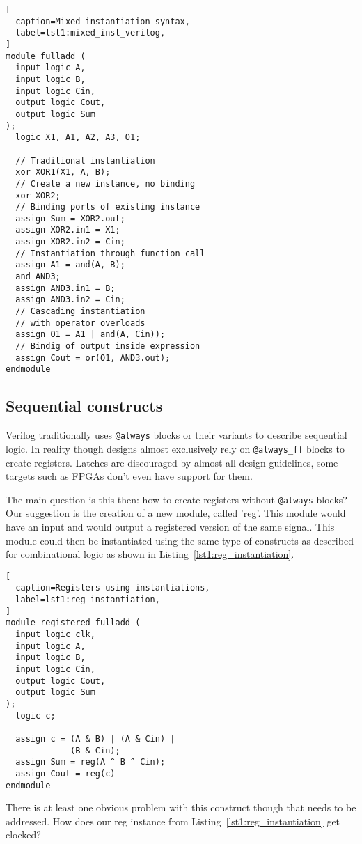 \documentclass[conference,compsoc]{IEEEtran}
\begin{document}
\begin{lstlisting}[
  caption=Mixed instantiation syntax,
  label=lst1:mixed_inst_verilog,
]
module fulladd (
  input logic A,
  input logic B,
  input logic Cin,
  output logic Cout,
  output logic Sum
);
  logic X1, A1, A2, A3, O1;

  // Traditional instantiation
  xor XOR1(X1, A, B);
  // Create a new instance, no binding
  xor XOR2;
  // Binding ports of existing instance
  assign Sum = XOR2.out;
  assign XOR2.in1 = X1;
  assign XOR2.in2 = Cin;
  // Instantiation through function call
  assign A1 = and(A, B);
  and AND3;
  assign AND3.in1 = B;
  assign AND3.in2 = Cin;
  // Cascading instantiation
  // with operator overloads
  assign O1 = A1 | and(A, Cin));
  // Bindig of output inside expression
  assign Cout = or(O1, AND3.out);
endmodule
\end{lstlisting}

\subsection{Sequential constructs}
Verilog traditionally uses {\tt @always} blocks or their variants to describe sequential
logic. In reality though designs almost exclusively rely on {\tt @always\_ff} blocks to
create registers. Latches are discouraged by almost all design guidelines, some targets
such as FPGAs don't even have support for them.

The main question is this then: how to create registers without {\tt @always} blocks?
Our suggestion is the creation of a new module, called 'reg'. This module would have
an input and would output a registered version of the same signal. This module could then
be instantiated using the same type of constructs as described for combinational logic
as shown in Listing~\ref{lst1:reg_instantiation}.

\begin{lstlisting}[
  caption=Registers using instantiations,
  label=lst1:reg_instantiation,
]
module registered_fulladd (
  input logic clk,
  input logic A,
  input logic B,
  input logic Cin,
  output logic Cout,
  output logic Sum
);
  logic c;

  assign c = (A & B) | (A & Cin) |
             (B & Cin);
  assign Sum = reg(A ^ B ^ Cin);
  assign Cout = reg(c)
endmodule
\end{lstlisting}

There is at least one obvious problem with this construct though that needs to be addressed.
How does our reg instance from Listing~\ref{lst1:reg_instantiation} get clocked?
\end{document}
